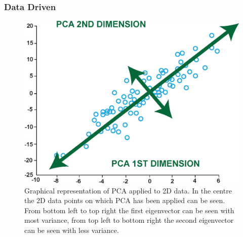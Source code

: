             \subsubsection{Data Driven} \label{sec:data_driven}
                \begin{figure}
                    \centering
                        
                    \includegraphics[width=1.0\linewidth]{figures/background_pca.png}
                        
                    \captionsetup{singlelinecheck=false}
                    \caption{
                        Graphical representation of \gls{PCA} applied to \gls{2D} data. In the centre the \gls{2D} data points on which \gls{PCA} has been applied can be seen. From bottom left to top right the first eigenvector can be seen with most variance, from top left to bottom right the second eigenvector can be seen with less variance.
                    }
                    \label{fig:data_driven_pca}
                \end{figure}
                
